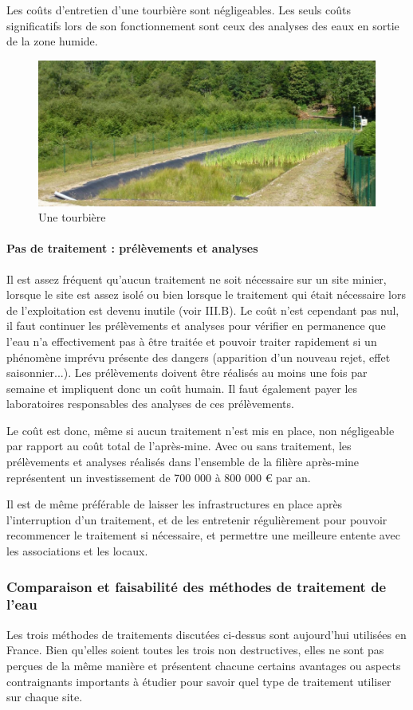 \documentclass{article}
\begin{document}
Les coûts d’entretien d’une tourbière sont négligeables. Les seuls coûts significatifs lors de son fonctionnement sont ceux des analyses des eaux en sortie de la zone humide.

\begin{figure}[H]
\centering
\includegraphics[width=0.8\linewidth]{III_A_4.png}
\caption{Une tourbière}
\label{fig:tourbiere}
\end{figure}


\paragraph{Pas de traitement : prélèvements et analyses}

Il est assez fréquent qu’aucun traitement ne soit nécessaire sur un site minier, lorsque le site est assez isolé ou bien lorsque le traitement qui était nécessaire lors de l’exploitation est devenu inutile (voir III.B). Le coût n’est cependant pas nul, il faut continuer les prélèvements et analyses pour vérifier en permanence que l’eau n’a effectivement pas à être traitée et pouvoir traiter rapidement si un phénomène imprévu présente des dangers (apparition d’un nouveau rejet, effet saisonnier...). Les prélèvements doivent être réalisés au moins une fois par semaine et impliquent donc un coût humain. Il faut également payer les laboratoires responsables des analyses de ces prélèvements.

Le coût est donc, même si aucun traitement n’est mis en place, non négligeable  par rapport au coût total de l’après-mine. Avec ou sans traitement, les prélèvements et analyses réalisés dans l’ensemble de la filière après-mine représentent un investissement de 700 000 à 800 000 € par an.

Il est de même préférable de laisser les infrastructures en place après l'interruption d’un traitement, et de les entretenir régulièrement pour pouvoir recommencer le traitement si nécessaire, et permettre  une meilleure entente avec les associations et les locaux. 


\subsubsection{Comparaison et faisabilité des méthodes de traitement de l'eau}
Les trois méthodes de traitements discutées ci-dessus sont aujourd’hui utilisées en France. Bien qu’elles soient toutes les trois non destructives, elles ne sont pas perçues de la même manière et présentent chacune certains avantages ou aspects contraignants importants à étudier pour savoir quel type de traitement utiliser sur chaque site.
\end{document}
